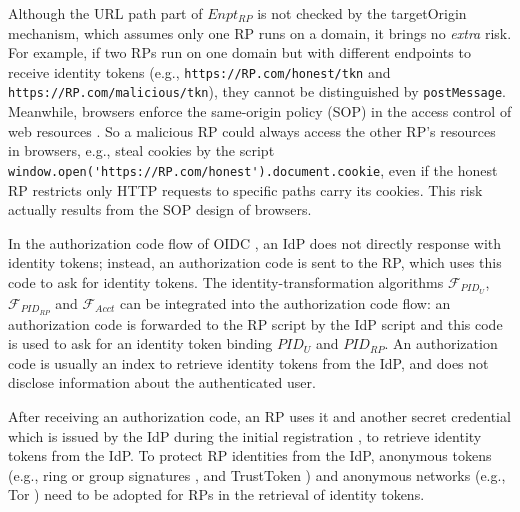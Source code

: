 Although the URL path part of $Enpt_{RP}$ %
 is not checked by the targetOrigin mechanism,
  which assumes only one RP runs on a domain,
   it brings no \emph{extra} risk.
For example, if two RPs run on one domain but with different endpoints to receive identity tokens
        (e.g., \verb+https://RP.com/honest/tkn+ and \verb+https://RP.com/malicious/tkn+),
         they cannot be distinguished by \verb+postMessage+.
Meanwhile, browsers enforce
 the same-origin policy (SOP) in the access control of web resources \cite{sop}.
So
    a malicious RP could always access the other RP's resources in browsers,
        e.g., steal cookies
        by the script
        \verb+window.open('https://RP.com/honest').document.cookie+,
    even if the honest RP restricts only HTTP requests to specific paths carry its cookies.
This risk actually results from the SOP design of browsers.


\vspace{1mm}
In the authorization code flow of OIDC \cite{OpenIDConnect},
    an IdP does not directly response with identity tokens;
        instead,
            an authorization code is sent to the RP,
            which uses this code to ask for identity tokens.
The identity-transformation algorithms $\mathcal{F}_{PID_{U}}$, $\mathcal{F}_{PID_{RP}}$ and $\mathcal{F}_{Acct}$
    can be integrated into the authorization code flow:
            an authorization code is forwarded to the RP script by the IdP script
                and this code is used to ask for an identity token binding $PID_U$ and $PID_{RP}$.
An authorization code is usually an index to retrieve identity tokens from the IdP,
        and does not disclose information about the authenticated user.


After receiving an authorization code, an RP uses it and another secret credential
         which is issued by the IdP during the initial registration \cite{OpenIDConnect},
     to retrieve identity tokens from the IdP.
To protect RP identities from the IdP,
        anonymous tokens (e.g., ring or group signatures \cite{ring-sig,chaum1991group},
         and TrustToken \cite{trusttoken})
        and anonymous networks (e.g., Tor \cite{tor}) need to be adopted for RPs
         in the retrieval of identity tokens.





